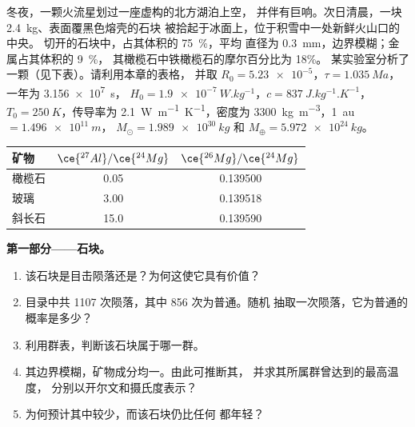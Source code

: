 \begin{problem}
\label{pb:b2:planet-formation-meteorites:1}
冬夜，一颗火流星划过一座虚构的北方湖泊上空，
并伴有巨响。次日清晨，一块 \qty{2.4}{kg}、表面覆黑色熔壳的石块
被拾起于冰面上，位于积雪中一处新鲜火山口的中央。
切开的石块中，占其体积的 \qty{75}{\percent}，平均
直径为 \qty{0.3}{mm}，边界模糊；金属占其体积的 \qty{9}{\percent}，
其橄榄石中铁橄榄石的摩尔百分比为 18\%。
某实验室分析了一颗（见下表）。请利用本章的表格，
并取 $R_0 = \num{5.23e-5}$，$\tau = \qty{1.035}{Ma}$，一年为 \qty{3.156e7}{s}，
$H_0 = \qty{1.9e-7}{W.kg^{-1}}$，$c = \qty{837}{J.kg^{-1}.K^{-1}}$，
$T_0 = \qty{250}{K}$，传导率为 \qty{2.1}{W.m^{-1}.K^{-1}}，密度为
\qty{3300}{kg.m^{-3}}，\qty{1}{au} $= \qty{1.496e11}{m}$，
$M_\odot = \qty{1.989e30}{kg}$ 和 $M_\oplus = \qty{5.972e24}{kg}$。

\begin{center}
\small
\begin{tabular}{lcc}
\hline
矿物 & $\ce{^{27}Al}/\ce{^{24}Mg}$ & $\ce{^{26}Mg}/\ce{^{24}Mg}$\\
\hline
橄榄石 & 0.05 & \num{0.139500}\\
玻璃 & 3.00 & \num{0.139518}\\
斜长石 & 15.0 & \num{0.139590}\\
\hline
\end{tabular}
\end{center}

\medskip
\noindent\textbf{第一部分——石块。}
\begin{enumerate}
  \item 该石块是目击陨落还是？为何这使它具有价值？
  \item 目录中共 \num{1107} 次陨落，其中 856 次为普通。随机
        抽取一次陨落，它为普通的概率是多少？
  \item 利用群表，判断该石块属于哪一群。
  \item 其边界模糊，矿物成分均一。由此可推断其，
        并求其所属群曾达到的最高温度，
        分别以开尔文和摄氏度表示？
  \item 为何预计其中较少，而该石块仍比任何
        都年轻？
\end{enumerate}


\end{problem}
